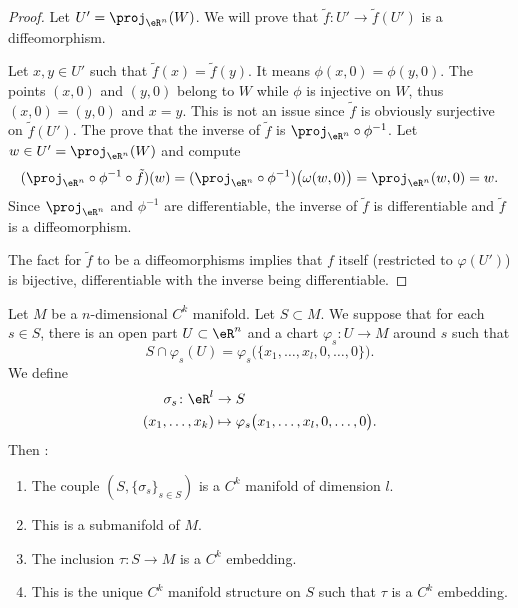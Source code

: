 \begin{proof}
	Let \( U'=\proj_{\eR^n}(W)\). We will prove that \( \tilde f\colon U'\to \tilde f(U')\) is a diffeomorphism.
	\begin{subproof}
		\spitem[Injective]
		Let \( x,y\in U'\) such that \( \tilde f(x)=\tilde f(y)\). It means \( \phi(x,0)=\phi(y,0)\). The points \( (x,0)\) and \( (y,0)\) belong to \( W\) while \( \phi\) is injective on \( W\), thus \( (x,0)=(y,0)\) and \( x=y\).
		\spitem[Surjective]
		This is not an issue since \( \tilde f\) is obviously surjective on \( \tilde f(U')\).
		The prove that the inverse of \( \tilde f\) is \( \proj_{\eR^n}\circ \phi^{-1}\). Let \( w\in U'=\proj_{\eR^n}(W)\) and compute
		\begin{equation}
			(\proj_{\eR^n}\circ \phi^{-1}\circ\tilde f)(w)=(\proj_{\eR^n}\circ\phi^{-1})\big( \omega(w,0) \big)=\proj_{\eR^n}(w,0)=w.
		\end{equation}
		\spitem[Diffeomorphism]
		Since \( \proj_{\eR^n}\) and \( \phi^{-1}\) are differentiable, the inverse of \( \tilde f\) is differentiable and \( \tilde f\) is a diffeomorphism.
	\end{subproof}
	The fact for \( \tilde f\) to be a diffeomorphisms implies that \( f\) itself (restricted to \( \varphi(U')\)) is bijective, differentiable with the inverse being differentiable.
\end{proof}

\begin{proposition}	\label{PROPooMNSUooSsnRkM}
	Let \( M\) be a \( n\)-dimensional \( C^k\) manifold. Let \( S\subset M\). We suppose that for each \( s\in S\), there is an open part \( U\subset\eR^n\) and a chart \(\varphi_s \colon U\to M  \) around \( s\) such that
	\begin{equation}
		S\cap\varphi_s(U)=\varphi_s\big( \{ x_1,\ldots,x_l,0,\ldots,0 \} \big).
	\end{equation}
	We define
	\begin{equation}
		\begin{aligned}
			\sigma_s\colon \eR^l & \to S                                                   \\
			(x_1,\ldots,x_k)     & \mapsto \varphi_s\big( x_1,\ldots,x_l,0,\ldots,0 \big).
		\end{aligned}
	\end{equation}
	Then :
	\begin{enumerate}
		\item
		      The couple	\( (S,\{ \sigma_s \}_{s\in S})\) is a \( C^k\) manifold of dimension \( l\).
		\item
		      This is a submanifold of \( M\).
		\item
		      The inclusion \(\tau \colon S\to M  \) is a \( C^k\) embedding.
		\item
		      This is the unique \( C^k\) manifold structure on \( S\) such that \( \tau\) is a \( C^k\) embedding.
	\end{enumerate}
\end{proposition}



